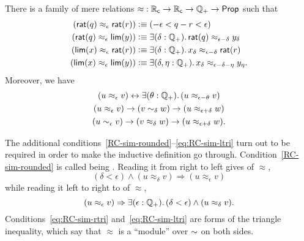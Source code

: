 
\begin{thm}\label{defn:RC-approx}
  There is a family of mere relations $\mathord\approx:\mathbb{R}_\mathsf{c}\to\mathbb{R}_\mathsf{c}\to\mathbb{Q}_{+}\to\mathsf{Prop}$ such that
  \begin{align}
    (\rcrat(q) \approx_\epsilon \rcrat(r))  &\defeq
    (-\epsilon < q - r < \epsilon)\label{eq:RCappx1}\\
    (\rcrat(q) \approx_\epsilon \rclim(y)) &\defeq
    \exis{\delta : \Qp} \rcrat(q) \approx_{\epsilon - \delta} y_\delta\label{eq:RCappx2}\\
    (\rclim(x) \approx_\epsilon \rcrat(r)) &\defeq
    \exis{\delta : \Qp} x_\delta \approx_{\epsilon - \delta} \rcrat(r)\label{eq:RCappx3}\\
    (\rclim(x) \approx_\epsilon \rclim(y)) &\defeq
    \exis{\delta, \eta : \Qp} x_\delta \approx_{\epsilon - \delta - \eta} y_\eta.\label{eq:RCappx4}
  \end{align}
  Moreover, we have
  \begin{gather}
    (u \approx_\epsilon v) \leftrightarrow \exis{\theta:\Qp} (u \approx_{\epsilon-\theta} v) \label{RC-sim-rounded}\\
    (u \approx_\epsilon v) \to (v\close\delta w) \to (u\approx_{\epsilon+\delta} w)\label{eq:RC-sim-rtri}\\ 
    (u \close\epsilon v) \to (v\approx_\delta w) \to (u\approx_{\epsilon+\delta} w)\label{eq:RC-sim-ltri}.
  \end{gather}
\end{thm}

The additional conditions~\eqref{RC-sim-rounded}--\eqref{eq:RC-sim-ltri} turn out to be required in order to make the inductive definition go through.
Condition~\eqref{RC-sim-rounded} is called being .
Reading it from right to left gives  of $\approx$,
%
\begin{equation*}
  (\delta < \epsilon) \land (u \approx_\delta v) \Rightarrow (u \approx_\epsilon v)
\end{equation*}
%
while reading it left to right to  of $\approx$,
%
\begin{equation*}
  (u \approx_\epsilon v) \Rightarrow \exis{\epsilon : \Qp} (\delta < \epsilon) \land (u \approx_\delta v).
\end{equation*}
%
Conditions~\eqref{eq:RC-sim-rtri} and~\eqref{eq:RC-sim-ltri} are forms of the triangle inequality, which say that $\approx$ is a ``module'' over $\mathord\sim$ on both sides.

